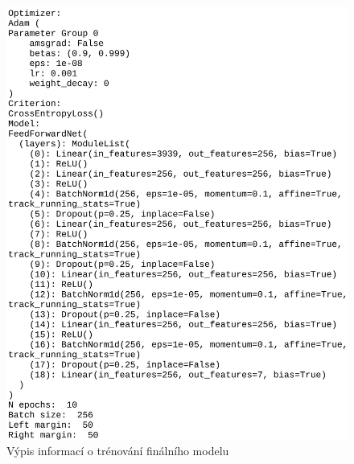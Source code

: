 \documentclass[FM,BP]{tulthesis}
\begin{document}
\begin{figure}[!htbp]
\centerline{\includegraphics[scale=.22]{final_model_architecture.png}}
\caption{Výpis informací o trénování finálního modelu}
\label{fig:final_model_architecture}
\end{figure}
\FloatBarrier
\end{document}
